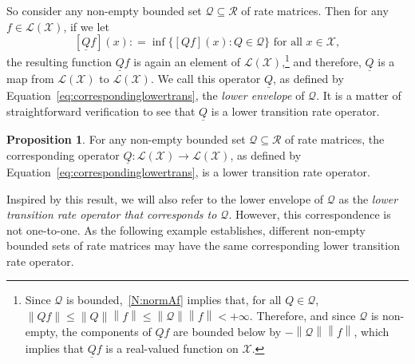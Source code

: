 \documentclass[10pt,a4paper]{paper}
\theoremstyle{definition}
\newtheorem{proposition}[theorem]{Proposition}
\newcommand{\states}{\mathcal{X}}
\newcommand{\gambles}{\mathcal{L}}
\newcommand{\gamblesX}{\gambles(\states)}
\newcommand{\rateset}{\mathcal{Q}}
\newcommand{\lrate}{\underline{Q}}
\newcommand{\norm}[1]{\left\lVert #1 \right\rVert}
\newcommand{\coloneqq}{:\!=}
\begin{document}
So consider any non-empty bounded set $\rateset\subseteq\mathcal{R}$ of rate matrices. Then for any $f\in\gamblesX$, if we let
\begin{equation}\label{eq:correspondinglowertrans}
[\lrate f](x)\coloneqq\inf\{[Qf](x)\colon Q\in\rateset\}
\text{ for all $x\in\states$},%
\end{equation}
the resulting function $\lrate f$ is again an element of $\gamblesX$,\footnote{%
Since $\rateset$ is bounded,~\ref{N:normAf} implies that, for all $Q\in\rateset$, $\norm{Qf}\leq\norm{Q}\norm{f}\leq\norm{\rateset}\norm{f}<+\infty$. Therefore, and since $\rateset$ is non-empty, the components of $\lrate f$ are bounded below by $-\norm{\rateset}\norm{f}$, which implies that $\lrate f$ is a real-valued function on $\states$.}
and therefore, $\lrate$ is a map from $\gamblesX$ to $\gamblesX$. We call this operator $\lrate$, as defined by Equation~\eqref{eq:correspondinglowertrans}, the \emph{lower envelope} of $\rateset$. It is a matter of straightforward verification to see that $\lrate$ is a lower transition rate operator.

\begin{proposition}\label{prop:lowerenvelopeislowertrans}
For any non-empty bounded set $\rateset\subseteq\mathcal{R}$ of rate matrices, the corresponding operator $\lrate\colon\gamblesX\to\gamblesX$, as defined by Equation~\eqref{eq:correspondinglowertrans}, is a lower transition rate operator.
\end{proposition}

\noindent
Inspired by this result, we will also refer to the lower envelope of $\rateset$ as the \emph{lower transition rate operator that corresponds to $\rateset$}. %
However, this correspondence is not one-to-one. As the following example establishes, different non-empty bounded sets of rate matrices may have the same corresponding lower transition rate operator.
\end{document}
